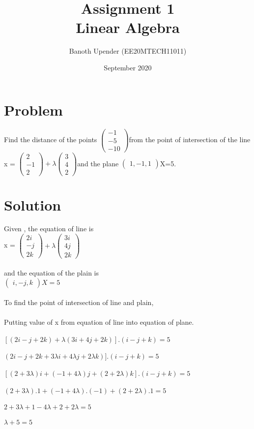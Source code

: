 \documentclass{article}
\title{Assignment 1
\\Linear Algebra }
\author{Banoth Upender (EE20MTECH11011) }
\date{September 2020}
\newcommand{\myvec}[1]{\ensuremath{\begin{pmatrix}#1\end{pmatrix}}}
\begin{document}
\maketitle


\section{Problem}
Find the distance of the points \myvec{-1 \\-5 \\-10}from the point of intersection of the line x = $\myvec{2 \\-1 \\2} + \lambda \myvec{3 \\4 \\2}$and the plane \myvec{1 , -1 , 1}X=5.

\section{Solution}
Given , the equation of line is
\\x = $\myvec{2i \\-j \\2k} + \lambda \myvec{3i \\4j \\2k}$
\\
\\and the equation of the plain is
\\
 $\myvec{i , -j , k}X=5$
\\
\\To find the point of intersection of line and plain,
\\
\\Putting value of x from equation of line into equation of plane.
\\
\\$[(2i - j + 2k)+ \lambda(3i + 4j + 2k)].(i -j + k) = 5 $
\\
\\$(2i - j + 2k +3\lambda i + 4\lambda j + 2\lambda k )].(i - j + k) = 5 $
\\
\\$[(2 + 3\lambda)i + (-1 + 4\lambda)j + (2 + 2\lambda)k].(i - j + k) = 5 $
\\
\\$(2 + 3\lambda).1 + (-1 +4\lambda).(-1) + (2 + 2\lambda).1 = 5 $
\\
\\ $2 + 3\lambda + 1 -4\lambda + 2 + 2\lambda = 5 $
\\
\\ $ \lambda + 5 = 5$  
\end{document}
